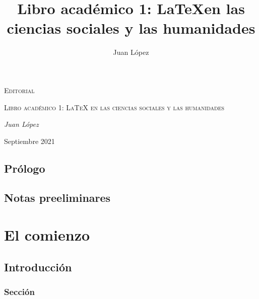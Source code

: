 \documentclass[12pt,c5paper,oneside]{book} %
\title{Libro académico 1: \LaTeX en las ciencias sociales y las humanidades}
\author{Juan López}
\date{} %
\begin{document}

 {\let\cleardoublepage\relax \frontmatter} %

\maketitle

\clearpage{\pagestyle{empty}\cleardoublepage}%


\begin{titlepage}
	\centering
	\vspace{1cm}
	\textsc{\Large Editorial} \par
	\vspace{3cm}
	{\scshape\Huge Libro académico 1: \LaTeX { }en las ciencias sociales y las humanidades \par}
	\vspace{3cm}
	\vfill
	{\Large \emph{Juan López} \par}
	\vfill
	{\Large Septiembre 2021 \par}
\end{titlepage} 
\clearpage{\pagestyle{empty}\cleardoublepage}

\frontmatter
\tableofcontents

\chapter{Prólogo}

\lipsum[1-7]

\chapter{Notas preeliminares}

\lipsum[1-7]

\mainmatter

\part{El comienzo}

\chapter{Introducción}

\lipsum[1-4]

\section{Sección}
\end{document}
